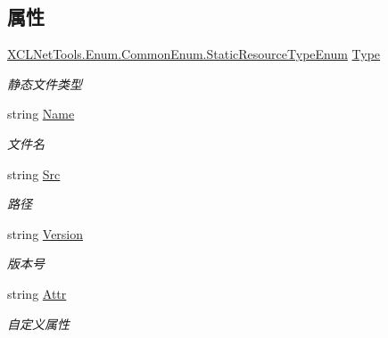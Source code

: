 \subsection*{属性}
\begin{DoxyCompactItemize}
\item 
\hyperlink{class_x_c_l_net_tools_1_1_enum_1_1_common_enum_abe6c6928080288df4a77ec8a59c537d1}{X\-C\-L\-Net\-Tools.\-Enum.\-Common\-Enum.\-Static\-Resource\-Type\-Enum} \hyperlink{class_x_c_l_net_tools_1_1_entity_1_1_static_resource_a182146de67a26e9ab0efdd2e8e3460dc}{Type}
\begin{DoxyCompactList}\small\item\em 静态文件类型 \end{DoxyCompactList}\item 
string \hyperlink{class_x_c_l_net_tools_1_1_entity_1_1_static_resource_a8e114996e0fb52d9543e5b018e0d09e5}{Name}
\begin{DoxyCompactList}\small\item\em 文件名 \end{DoxyCompactList}\item 
string \hyperlink{class_x_c_l_net_tools_1_1_entity_1_1_static_resource_a956fb610dd51730bbe8aac6a04d72da3}{Src}
\begin{DoxyCompactList}\small\item\em 路径 \end{DoxyCompactList}\item 
string \hyperlink{class_x_c_l_net_tools_1_1_entity_1_1_static_resource_a4b85a7d2f6dc6169a10ebfe2987f2404}{Version}
\begin{DoxyCompactList}\small\item\em 版本号 \end{DoxyCompactList}\item 
string \hyperlink{class_x_c_l_net_tools_1_1_entity_1_1_static_resource_a7541eec0c18e1aac9a8d0c980f1c7b35}{Attr}
\begin{DoxyCompactList}\small\item\em 自定义属性 \end{DoxyCompactList}\end{DoxyCompactItemize}


